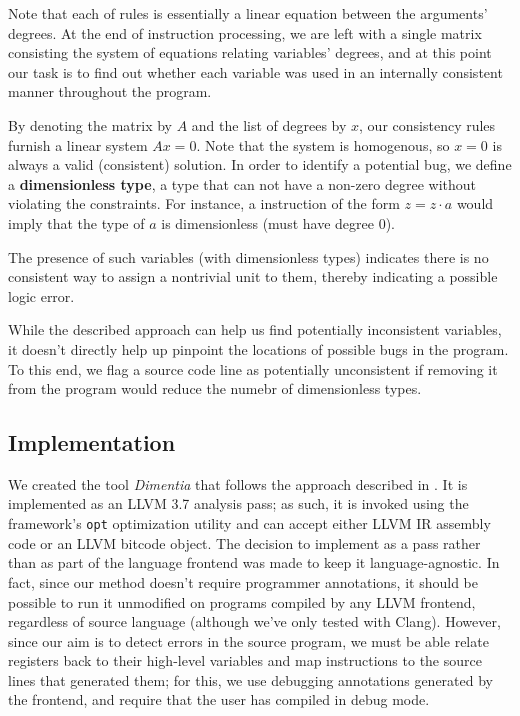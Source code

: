 \documentclass[12pt]{article}
\begin{document}
Note that each of rules is essentially a linear equation between the arguments' degrees.
At the end of instruction processing, we are left with a single matrix consisting the system of equations relating variables' degrees, and at this point our task is to find out whether each variable was used in an internally consistent manner throughout the program.

By denoting the matrix by $A$ and the list of degrees by $x$, our consistency rules furnish a linear system $Ax = 0$.
Note that the system is homogenous, so $x = 0$ is always a valid (consistent) solution.
In order to identify a potential bug, we define a \textbf{dimensionless type}, a type that can not have a non-zero degree without violating the constraints.
For instance, a instruction of the form $z = z \cdot a$ would imply that the type of $a$ is dimensionless (must have degree 0).

The presence of such variables (with dimensionless types) indicates there is no consistent way to assign a nontrivial unit to them, thereby indicating a possible logic error.

While the described approach can help us find potentially inconsistent variables, it doesn't directly help up pinpoint the locations of possible bugs in the program.
To this end, we flag a source code line as potentially unconsistent if removing it from the program would reduce the numebr of dimensionless types.

\subsection{Implementation}

We created the tool \textit{Dimentia} that follows the approach described in .
It is implemented as an LLVM 3.7 analysis pass; as such, it is invoked using the framework's \texttt{opt} optimization utility and can accept either LLVM IR assembly code or an LLVM bitcode object.
The decision to implement as a pass rather than as part of the language frontend was made to keep it language-agnostic.
In fact, since our method doesn't require programmer annotations, it should be possible to run it unmodified on programs compiled by any LLVM frontend, regardless of source language (although we've only tested with Clang).
However, since our aim is to detect errors in the source program, we must be able relate registers back to their high-level variables and map instructions to the source lines that generated them; for this, we use debugging annotations generated by the frontend, and require that the user has compiled in debug mode.
\end{document}

